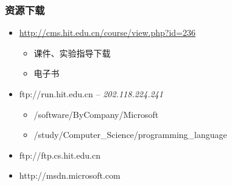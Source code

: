 \begin{frame}
\frametitle{资源下载}
\begin{itemize}
  \setlength{\itemsep}{.4cm plus 1pt}
\item \href{http://cms.hit.edu.cn/course/view.php?id=236}{http://cms.hit.edu.cn/course/view.php?id=236}
  \begin{itemize}
    \setlength{\itemsep}{.2cm plus 1pt}
  \item 课件、实验指导下载
  \item 电子书
  \end{itemize}
\item ftp://run.hit.edu.cn -- \textit{202.118.224.241}
  \begin{itemize}
    \setlength{\itemsep}{.2cm plus 1pt}
  \item /software/ByCompany/Microsoft
  \item /study/Computer\_Science/programming\_language
  \end{itemize}
\item ftp://ftp.cs.hit.edu.cn
\item http://msdn.microsoft.com
\end{itemize}

\end{frame}


